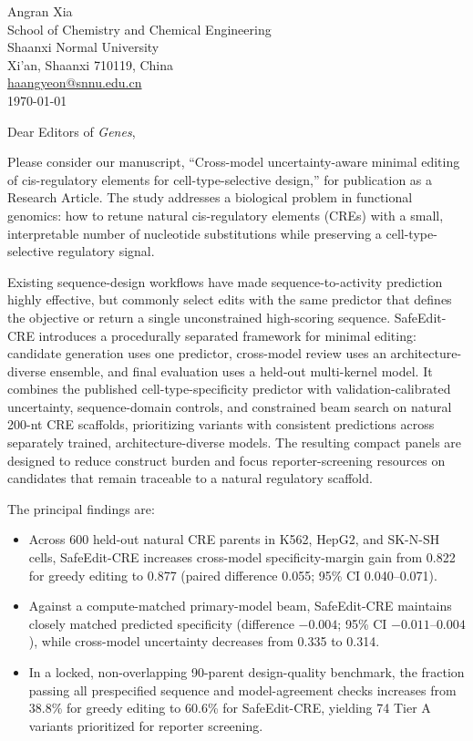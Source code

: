 \documentclass[11pt,a4paper]{article}
\begin{document}
\begin{flushright}
Angran Xia\\
School of Chemistry and Chemical Engineering\\
Shaanxi Normal University\\
Xi'an, Shaanxi 710119, China\\
\href{mailto:haangyeon@snnu.edu.cn}{haangyeon@snnu.edu.cn}\\[1em]
\today
\end{flushright}

Dear Editors of \emph{Genes},

Please consider our manuscript, ``Cross-model uncertainty-aware minimal editing of
cis-regulatory elements for cell-type-selective design,'' for publication as a Research
Article. The study addresses a biological problem in functional genomics: how to
retune natural cis-regulatory elements (CREs) with a small, interpretable number of
nucleotide substitutions while preserving a cell-type-selective regulatory signal.

Existing sequence-design workflows have made sequence-to-activity prediction highly
effective, but commonly select edits with the same predictor that defines the objective
or return a single unconstrained high-scoring sequence. SafeEdit-CRE introduces a
procedurally separated framework for minimal editing: candidate generation uses one
predictor, cross-model review uses an architecture-diverse ensemble, and final
evaluation uses a held-out multi-kernel model. It combines the published
cell-type-specificity predictor with validation-calibrated uncertainty,
sequence-domain controls, and constrained beam search on natural 200-nt CRE scaffolds,
prioritizing variants with consistent predictions across separately trained,
architecture-diverse models. The resulting compact panels are designed to reduce
construct burden and focus reporter-screening resources on candidates that remain
traceable to a natural regulatory scaffold.

The principal findings are:
\begin{itemize}
  \item Across 600 held-out natural CRE parents in K562, HepG2, and SK-N-SH cells,
  SafeEdit-CRE increases cross-model specificity-margin gain from 0.822 for greedy
  editing to 0.877 (paired difference 0.055; 95\% CI 0.040--0.071).
  \item Against a compute-matched primary-model beam, SafeEdit-CRE maintains closely
  matched predicted specificity (difference $-0.004$; 95\% CI $-0.011$--$0.004$),
  while cross-model uncertainty decreases from 0.335 to 0.314.
  \item In a locked, non-overlapping 90-parent design-quality benchmark, the fraction
  passing all prespecified sequence and model-agreement checks increases from 38.8\%
  for greedy editing to 60.6\% for SafeEdit-CRE, yielding 74 Tier A variants
  prioritized for reporter screening.
\end{itemize}
\end{document}
